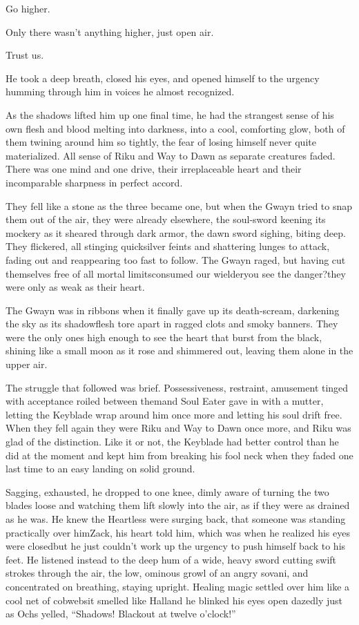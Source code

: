 \textemdash Go higher.

Only there wasn't anything higher, just open air.

\textemdash Trust us.

He took a deep breath, closed his eyes, and opened himself to the urgency humming through him in voices he almost recognized.

As the shadows lifted him up one final time, he had the strangest sense of his own flesh and blood melting into darkness, into a cool, comforting glow, both of them twining around him so tightly, the fear of losing himself never quite materialized. All sense of Riku and Way to Dawn as separate creatures faded. There was one mind and one drive, their irreplaceable heart and their incomparable sharpness in perfect accord.

They fell like a stone as the three became one, but when the Gwayn tried to snap them out of the air, they were already elsewhere, the soul-sword keening its mockery as it sheared through dark armor, the dawn sword sighing, biting deep. They flickered, all stinging quicksilver feints and shattering lunges to attack, fading out and reappearing too fast to follow. The Gwayn raged, but having cut themselves free of all mortal limits\textemdash consumed our wielder\textemdash you see the danger?\textemdash they were only as weak as their heart.

The Gwayn was in ribbons when it finally gave up its death-scream, darkening the sky as its shadowflesh tore apart in ragged clots and smoky banners. They were the only ones high enough to see the heart that burst from the black, shining like a small moon as it rose and shimmered out, leaving them alone in the upper air.

The struggle that followed was brief. Possessiveness, restraint, amusement tinged with acceptance roiled between them\textemdash and Soul Eater gave in with a mutter, letting the Keyblade wrap around him once more and letting his soul drift free. When they fell again they were Riku and Way to Dawn once more, and Riku was glad of the distinction. Like it or not, the Keyblade had better control than he did at the moment and kept him from breaking his fool neck when they faded one last time to an easy landing on solid ground.

Sagging, exhausted, he dropped to one knee, dimly aware of turning the two blades loose and watching them lift slowly into the air, as if they were as drained as he was. He knew the Heartless were surging back, that someone was standing practically over him\textemdash Zack, his heart told him, which was when he realized his eyes were closed\textemdash but he just couldn't work up the urgency to push himself back to his feet. He listened instead to the deep hum of a wide, heavy sword cutting swift strokes through the air, the low, ominous growl of an angry sovani, and concentrated on breathing, staying upright. Healing magic settled over him like a cool net of cobwebs\textemdash it smelled like Hall\textemdash and he blinked his eyes open dazedly just as Ochs yelled, ``Shadows! Blackout at twelve o'clock!''

